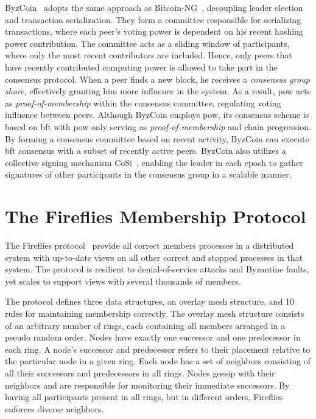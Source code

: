 \documentclass[USenglish]{uit-thesis}
\begin{document}


ByzCoin~\cite{byz} adopts the same approach as Bitcoin-NG~\cite{ng}, decoupling leader election and transaction serialization.
They form a committee responsible for serializing transactions, where each peer's voting power is dependent on his recent hashing power contribution.
The committee acts as a sliding window of participants, where only the most recent contributors are included.
Hence, only peers that have recently contributed computing power is allowed to take part in the consensus protocol.
When a peer finds a new block, he receives a \textit{consensus group share}, effectively granting him more influence in the system.
As a result, \gls{pow} acts as \textit{proof-of-membership} within the consensus committee, regulating voting influence between peers.
Although ByzCoin employs \gls{pow}, its consensus scheme is based on \gls{bft} with \gls{pow} only serving as \textit{proof-of-membership} and chain progression.
By forming a consensus committee based on recent activity, ByzCoin can execute \gls{bft} consensus with a subset of recently active peers.
ByzCoin also utilizes a collective signing mechanism CoSi~\cite{cos}, enabling the leader in each epoch to gather signatures of other participants in the consensus group in a scalable manner.




\chapter{The Fireflies Membership Protocol}\label{chap:fireflies}


The Fireflies protocol~\cite{flies, flies2} provide all correct members processes in a distributed system with up-to-date views on all other correct and stopped processes in that system. The protocol is resilient to denial-of-service attacks and Byzantine faults, yet scales to support views with several thousands of members.

The protocol defines three data structures, an overlay mesh structure, and 10 rules for maintaining membership correctly. 
The overlay mesh structure consists of an arbitrary number of rings, each containing all members arranged in a pseudo random order.
Nodes have exactly one successor and one predecessor in each ring. 
A node's successor and predecessor refers to their placement relative to the particular node in a given ring.
Each node has a set of neighbors consisting of all their successors and predecessors in all rings. 
Nodes gossip with their neighbors and are responsible for monitoring their immediate successors.
By having all participants present in all rings, but in different orders, Fireflies enforces diverse neighbors. 
\end{document}

